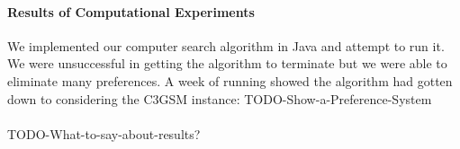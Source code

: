\paragraph{Results of Computational Experiments}
We implemented our computer search algorithm in Java and attempt to run it. We were unsuccessful in getting the algorithm to terminate but we were able to eliminate many preferences. A week of running showed the algorithm had gotten down to considering the C3GSM instance:
TODO-Show-a-Preference-System
\paragraph{}
TODO-What-to-say-about-results?
